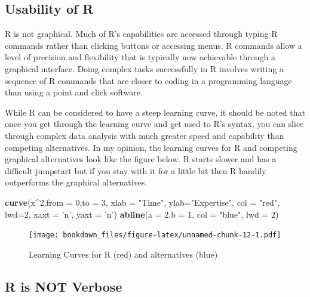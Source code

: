 \documentclass[]{krantz}
\makeatletter
\newenvironment{Shaded}{\begin{snugshade}}{\end{snugshade}}
\newcommand{\KeywordTok}[1]{\textcolor[rgb]{0.27,0.27,0.27}{\textbf{#1}}}
\newcommand{\DataTypeTok}[1]{\textcolor[rgb]{0.27,0.27,0.27}{#1}}
\newcommand{\DecValTok}[1]{\textcolor[rgb]{0.06,0.06,0.06}{#1}}
\newcommand{\StringTok}[1]{\textcolor[rgb]{0.5,0.5,0.5}{#1}}
\newcommand{\OperatorTok}[1]{\textcolor[rgb]{0.81,0.36,0.00}{\textbf{#1}}}
\newcommand{\NormalTok}[1]{#1}
\newenvironment{kframe}{%
\medskip{}
\setlength{\fboxsep}{.8em}
 \def\at@end@of@kframe{}%
 \ifinner\ifhmode%
  \def\at@end@of@kframe{\end{minipage}}%
  \begin{minipage}{\columnwidth}%
 \fi\fi%
 \def\FrameCommand##1{\hskip\@totalleftmargin \hskip-\fboxsep
 \colorbox{shadecolor}{##1}\hskip-\fboxsep
     \hskip-\linewidth \hskip-\@totalleftmargin \hskip\columnwidth}%
 \MakeFramed {\advance\hsize-\width
   \@totalleftmargin\z@ \linewidth\hsize
   \@setminipage}}%
 {\par\unskip\endMakeFramed%
 \at@end@of@kframe}
\renewenvironment{Shaded}{\begin{kframe}}{\end{kframe}}
\theoremstyle{definition}
\theoremstyle{definition}
\theoremstyle{definition}
\theoremstyle{remark}
\makeatother
\begin{document}
\subsection{Usability of R}\label{usability-of-r}

R is not graphical. Much of R's capabilities are accessed through typing
R commands rather than clicking buttons or accessing menus. R commands
allow a level of precision and flexibility that is typically now
achievable through a graphical interface. Doing complex tasks
successfully in R involves writing a sequence of R commands that are
closer to coding in a programming language than using a point and click
software.

While R can be considered to have a steep learning curve, it should be
noted that once you get through the learning curve and get used to R's
syntax, you can slice through complex data analysis with much greater
speed and capability than competing alternatives. In my opinion, the
learning curves for R and competing graphical alternatives look like the
figure below. R starts slower and has a difficult jumpstart but if you
stay with it for a little bit then R handily outperforms the graphical
alternatives.

\begin{Shaded}
\begin{Highlighting}[]
\KeywordTok{curve}\NormalTok{(x}\OperatorTok{^}\DecValTok{2}\NormalTok{,}\DataTypeTok{from =} \DecValTok{0}\NormalTok{,}\DataTypeTok{to =} \DecValTok{3}\NormalTok{, }\DataTypeTok{xlab =} \StringTok{"Time"}\NormalTok{, }\DataTypeTok{ylab=}\StringTok{"Expertise"}\NormalTok{, }
      \DataTypeTok{col =} \StringTok{"red"}\NormalTok{, }\DataTypeTok{lwd=}\DecValTok{2}\NormalTok{, }\DataTypeTok{xaxt =} \StringTok{'n'}\NormalTok{, }\DataTypeTok{yaxt =} \StringTok{'n'}\NormalTok{)}
\KeywordTok{abline}\NormalTok{(}\DataTypeTok{a =} \DecValTok{2}\NormalTok{,}\DataTypeTok{b =} \DecValTok{1}\NormalTok{, }\DataTypeTok{col =} \StringTok{"blue"}\NormalTok{, }\DataTypeTok{lwd =} \DecValTok{2}\NormalTok{)}
\end{Highlighting}
\end{Shaded}

\begin{figure}
\centering
\texttt{[image: bookdown\_files/figure-latex/unnamed-chunk-12-1.pdf]}
\caption{\label{fig:unnamed-chunk-12}Learning Curves for R (red) and
alternatives (blue)}
\end{figure}

\subsection{R is NOT Verbose}\label{r-is-not-verbose}
\end{document}
